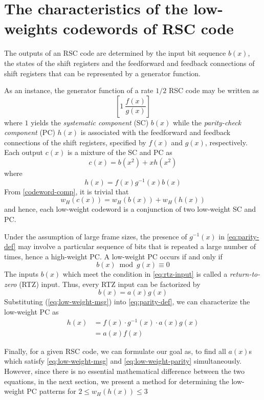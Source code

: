 \section{The characteristics of the low-weights codewords of RSC code}
\label{sec2}
The outputs of an RSC code are determined by the input bit sequence $b(x)$, the states of the shift registers and the feedforward and feedback connections of shift registers that can be represented by a generator function. 

As an instance,  the generator function of a rate $1/2$ RSC code may be written as  $$\left[1 ~\frac{f(x)}{g(x)}\right]$$ where $1$ yields the \textit{systematic  component} (SC) $b(x)$ while the \textit{parity-check component} (PC) $h(x)$ is associated with the feedforward and feedback connections of the shift registers, specified by $f(x)$ and $g(x)$, respectively. Each output $c(x)$ is a mixture of the SC and PC as
\begin{equation}
c(x) = b(x^2)+xh(x^2)
\label{codeword-comp}
\end{equation}
where 
\begin{equation}
h(x) =f(x)g^{-1}(x)b(x)
\label{eq:parity-def}
\end{equation}
From \eqref{codeword-comp}, it is trivial that
\begin{equation}
w_H(c(x))=w_H(b(x)) + w_H(h(x))
\label{eq:cw-weight}
\end{equation}
and hence, each low-weight codeword is a conjunction of two low-weight SC and PC.

Under the assumption of large frame sizes, the presence of $g^{-1}(x)$  in \eqref{eq:parity-def} may involve a particular sequence of bits that is repeated a large number of times, hence a high-weight PC. A low-weight PC occurs if and only if
\begin{equation}
b(x) \bmod g(x) \equiv 0
\label{eq:rtz-input}
\end{equation}
The inputs $b(x)$ which meet the condition in \eqref{eq:rtz-input} is called a \textit{return-to-zero} (RTZ) input. Thus, every RTZ input can be factorized by  
\begin{equation}
b(x) =a(x)g(x)
\label{eq:low-weight-msg}
\end{equation}
Substituting (\ref{eq:low-weight-msg}) into \eqref{eq:parity-def}, we can characterize the low-weight PC as
\begin{equation}
\begin{split}
h(x)&=f(x)\cdot g^{-1}(x)\cdot a(x)g(x)\\
&=a(x)f(x)
\end{split}
\label{eq:low-weight-parity}
\end{equation}

Finally, for a given RSC code, we can formulate our goal as, to find all $a(x)$s which satisfy  \eqref{eq:low-weight-msg} and  \eqref{eq:low-weight-parity} simultaneously. However, since there is no essential mathematical difference between the two equations, in the next section, we present a method for determining the low-weight PC patterns for $2 \leq w_H(h(x)) \leq 3$


